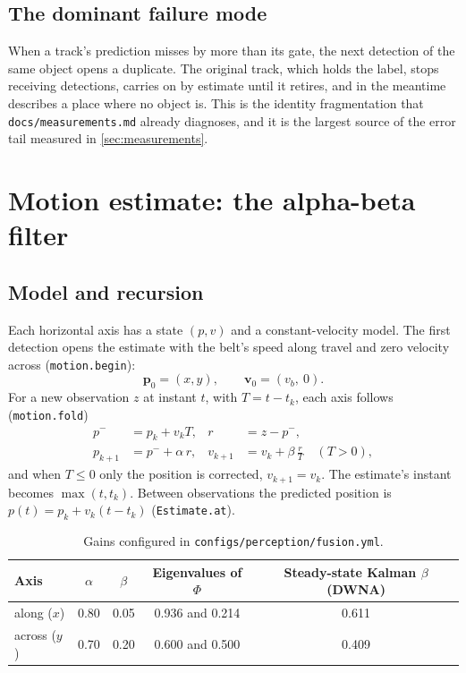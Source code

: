 \documentclass[11pt,a4paper]{article}
\theoremstyle{definition}
\theoremstyle{remark}
\newcommand{\code}[1]{\texttt{#1}}
\begin{document}
\subsection{The dominant failure mode}

When a track's prediction misses by more than its gate, the next detection of
the same object opens a duplicate. The original track, which holds the label,
stops receiving detections, carries on by estimate until it retires, and in the
meantime describes a place where no object is. This is the identity
fragmentation that \code{docs/measurements.md} already diagnoses, and it is the
largest source of the error tail measured in \cref{sec:measurements}.

\section{Motion estimate: the alpha-beta filter}
\label{sec:motion}

\subsection{Model and recursion}

Each horizontal axis has a state $(p, v)$ and a constant-velocity model. The
first detection opens the estimate with the belt's speed along travel and zero
velocity across (\code{motion.begin}):
\begin{equation}
\mathbf{p}_0 = (x, y),\qquad \mathbf{v}_0 = (v_b,\ 0).
\end{equation}
For a new observation $z$ at instant $t$, with $T = t - t_{k}$, each axis
follows (\code{motion.fold})
\begin{align}
\label{eq:ab}
p^- &= p_k + v_k T, & r &= z - p^-, \\
p_{k+1} &= p^- + \alpha\,r, & v_{k+1} &= v_k + \beta\,\frac{r}{T}\quad (T>0),
\end{align}
and when $T \le 0$ only the position is corrected, $v_{k+1} = v_k$. The
estimate's instant becomes $\max(t, t_k)$. Between observations the predicted
position is $p(t) = p_k + v_k (t - t_k)$ (\code{Estimate.at}).

\begin{table}[ht]
\centering
\caption{Gains configured in \code{configs/perception/fusion.yml}.}
\label{tab:gains}
\begin{tabular}{@{}lcccc@{}}
\toprule
Axis & $\alpha$ & $\beta$ & Eigenvalues of $\Phi$ & Steady-state Kalman $\beta$ (DWNA) \\
\midrule
along ($x$) & 0.80 & 0.05 & 0.936 and 0.214 & 0.611 \\
across ($y$) & 0.70 & 0.20 & 0.600 and 0.500 & 0.409 \\
\bottomrule
\end{tabular}
\end{table}
\end{document}

